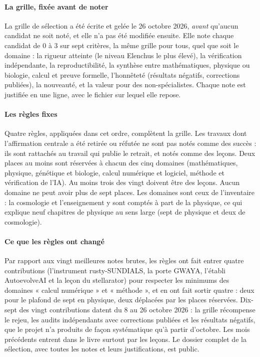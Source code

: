 \paragraph{La grille, fixée avant de noter} La grille de sélection a été écrite et gelée le 26 octobre 2026,
\emph{avant} qu'aucun candidat ne soit noté, et elle n'a pas été modifiée ensuite. Elle note chaque candidat de 0 à 3
sur sept critères, la même grille pour tous, quel que soit le domaine : la rigueur atteinte (le niveau Elenchus le plus
élevé), la vérification indépendante, la reproductibilité, la synthèse entre mathématiques, physique ou biologie,
calcul et preuve formelle, l'honnêteté (résultats négatifs, corrections publiées), la nouveauté, et la valeur pour
des non-spécialistes. Chaque note est justifiée en une ligne, avec le fichier sur lequel elle repose.

\paragraph{Les règles fixes} Quatre règles, appliquées dans cet ordre, complètent la grille. Les travaux dont
l'affirmation centrale a été retirée ou réfutée ne sont pas notés comme des succès : ils sont rattachés au travail
qui publie le retrait, et notés comme des leçons. Deux places au moins sont réservées à chacun des cinq domaines
(mathématiques, physique, génétique et biologie, calcul numérique et logiciel, méthode et vérification de l'IA). Au
moins trois des vingt doivent être des leçons. Aucun domaine ne peut avoir plus de sept places. Les domaines sont
ceux de l'inventaire : la cosmologie et l'enseignement y sont comptés à part de la physique, ce qui explique neuf
chapitres de physique au sens large (sept de physique et deux de cosmologie).

\paragraph{Ce que les règles ont changé} Par rapport aux vingt meilleures notes brutes, les règles ont fait entrer
quatre contributions (l'instrument rusty-SUNDIALS, la porte GWAYA, l'établi AutoevolveAI et la leçon du stellarator)
pour respecter les minimums des domaines « calcul numérique » et « méthode », et en ont fait sortir quatre : deux pour
le plafond de sept en physique, deux déplacées par les places réservées. Dix-sept des vingt contributions datent
du 8 au 26 octobre 2026 : la grille récompense le rejeu, les audits indépendants avec corrections publiées et les résultats
négatifs, que le projet n'a produits de façon systématique qu'à partir d'octobre. Les mois précédents entrent dans le
livre surtout par les leçons. Le dossier complet de la sélection, avec toutes les notes et leurs justifications, est
public.

